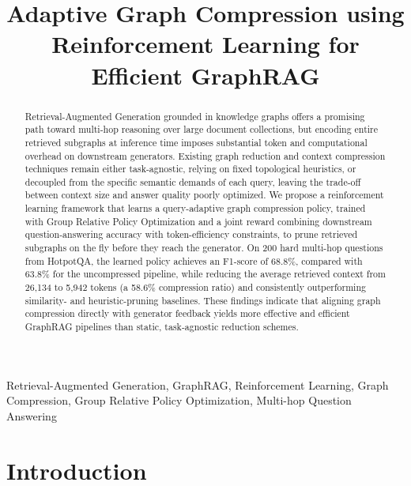\documentclass[conference]{IEEEtran}
\begin{document}
\title{Adaptive Graph Compression using Reinforcement Learning for Efficient GraphRAG}

\makeatletter
\newcommand{\linebreakand}{%
  \end{@IEEEauthorhalign}
  \hfill\mbox{}\par
  \mbox{}\hfill\begin{@IEEEauthorhalign}
}
\makeatother

\maketitle

\begin{abstract}
Retrieval-Augmented Generation grounded in knowledge graphs offers a promising path toward multi-hop reasoning over large document collections, but encoding entire retrieved subgraphs at inference time imposes substantial token and computational overhead on downstream generators. Existing graph reduction and context compression techniques remain either task-agnostic, relying on fixed topological heuristics, or decoupled from the specific semantic demands of each query, leaving the trade-off between context size and answer quality poorly optimized. We propose a reinforcement learning framework that learns a query-adaptive graph compression policy, trained with Group Relative Policy Optimization and a joint reward combining downstream question-answering accuracy with token-efficiency constraints, to prune retrieved subgraphs on the fly before they reach the generator. On 200 hard multi-hop questions from HotpotQA, the learned policy achieves an F1-score of 68.8\%, compared with 63.8\% for the uncompressed pipeline, while reducing the average retrieved context from 26,134 to 5,942 tokens (a 58.6\% compression ratio) and consistently outperforming similarity- and heuristic-pruning baselines. These findings indicate that aligning graph compression directly with generator feedback yields more effective and efficient GraphRAG pipelines than static, task-agnostic reduction schemes.
\end{abstract}
\begin{IEEEkeywords}
Retrieval-Augmented Generation, GraphRAG, Reinforcement Learning, Graph Compression, Group Relative Policy Optimization, Multi-hop Question Answering
\end{IEEEkeywords}

\section{Introduction}
\end{document}
